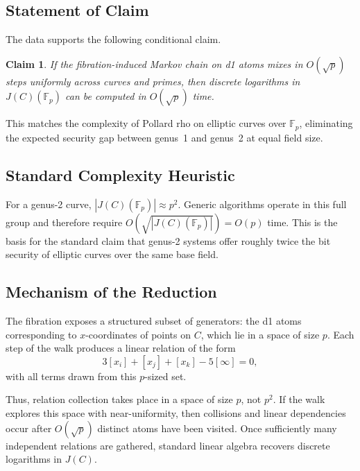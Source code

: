 \documentclass[11pt]{article}
\newtheorem{claim}[theorem]{Claim}
\theoremstyle{definition}
\theoremstyle{remark}
\newcommand{\Fp}{\mathbb{F}_p}
\newcommand{\Jp}{J(C)(\mathbb{F}_p)}
\newcommand{\BigO}[1]{O\!\left(#1\right)}
\begin{document}
\subsection{Statement of Claim}

The data supports the following conditional claim.

\begin{claim}
If the fibration-induced Markov chain on d1 atoms mixes in $\BigO{\sqrt{p}}$
steps uniformly across curves and primes, then discrete logarithms in $\Jp$
can be computed in $\BigO{\sqrt{p}}$ time.
\end{claim}

This matches the complexity of Pollard rho on elliptic curves over $\Fp$,
eliminating the expected security gap between genus~1 and genus~2 at equal
field size.

\subsection{Standard Complexity Heuristic}

For a genus-2 curve, $|\Jp| \approx p^2$. Generic algorithms operate in this
full group and therefore require $\BigO{\sqrt{|\Jp|}} = \BigO{p}$ time. This is
the basis for the standard claim that genus-2 systems offer roughly twice the
bit security of elliptic curves over the same base field.

\subsection{Mechanism of the Reduction}

The fibration exposes a structured subset of generators: the d1 atoms
corresponding to $x$-coordinates of points on $C$, which lie in a space of
size $p$. Each step of the walk produces a linear relation of the form
\[
  3[x_i] + [x_j] + [x_k] - 5[\infty] = 0,
\]
with all terms drawn from this $p$-sized set.

Thus, relation collection takes place in a space of size $p$, not $p^2$. If the
walk explores this space with near-uniformity, then collisions and linear
dependencies occur after $\BigO{\sqrt{p}}$ distinct atoms have been visited.
Once sufficiently many independent relations are gathered, standard linear
algebra recovers discrete logarithms in $J(C)$.
\end{document}
